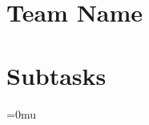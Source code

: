\documentclass[sigconf,article]{acmart}
\begin{document}
\section*{Team Name}
\teamname

\section*{Subtasks}
\subtasks










\begingroup
\Urlmuskip=0mu\relax
\def\UrlBreaks{\do\.\do\@\do\\\do\!\do\_\do\|\do\;\do\>\do\]\do\)\do\,\do\?\do\'\do\+\do\=\do\#\do\-}

\endgroup
\end{document}
